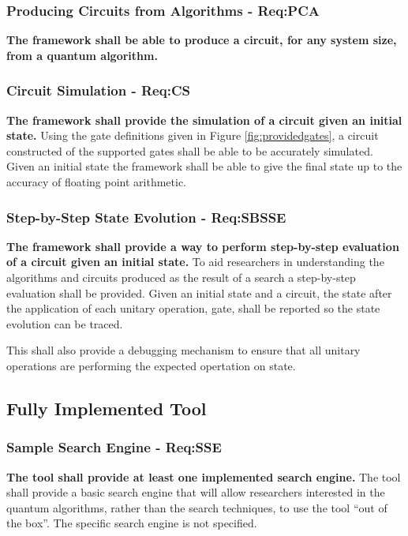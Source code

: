 \subsubsection{Producing Circuits from Algorithms - Req:PCA}
\label{sec:reqpca}
\textbf{The framework shall be able to produce a circuit, for any system size, from a quantum algorithm.}

\subsubsection{Circuit Simulation - Req:CS}
\label{sec:reqcs}
\textbf{The framework shall provide the simulation of a circuit given an initial state.}
Using the gate definitions given in Figure \ref{fig:providedgates}, a circuit constructed of the supported gates shall be able to be accurately simulated.
Given an initial state the framework shall be able to give the final state up to the accuracy of floating point arithmetic.

\subsubsection{Step-by-Step State Evolution - Req:SBSSE}
\label{sec:reqsbsse}
\textbf{The framework shall provide a way to perform step-by-step evaluation of a circuit given an initial state.}
To aid researchers in understanding the algorithms and circuits produced as the result of a search a step-by-step evaluation shall be provided.
Given an initial state and a circuit, the state after the application of each unitary operation, gate, shall be reported so the state evolution can be traced.

This shall also provide a debugging mechanism to ensure that all unitary operations are performing the expected opertation on state.

\subsection{Fully Implemented Tool}
\subsubsection{Sample Search Engine - Req:SSE}
\label{sec:reqsse}
\textbf{The tool shall provide at least one implemented search engine.}
The tool shall provide a basic search engine that will allow researchers interested in the quantum algorithms, rather than the search techniques, to use the tool ``out of the box''.
The specific search engine is not specified.

